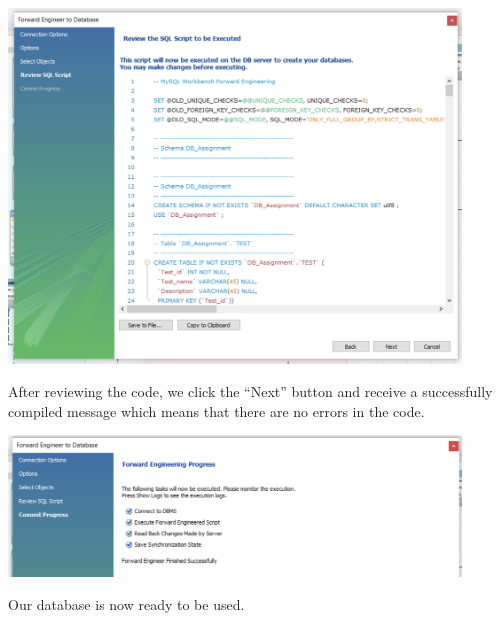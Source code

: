 \documentclass[a4paper]{article}
\numberwithin{equation}{section}
\begin{document}
\begin{center}
  \includegraphics[width=0.9\textwidth]{assets/step1.new.png}
\end{center}

After reviewing the code, we click the ``Next'' button and receive a successfully compiled message which means that there are no errors in the code.

\begin{center}
  \includegraphics[width=0.9\textwidth]{assets/step2.new.png}
\end{center}

Our database is now ready to be used.

\end{document}
